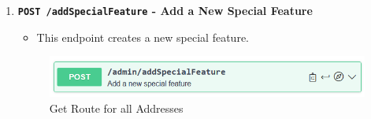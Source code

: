 \begin{enumerate}
        \item \textbf{\texttt{POST /addSpecialFeature} - Add a New Special Feature}
        \begin{itemize}
            \item This endpoint creates a new special feature.
        \end{itemize} 
        \begin{figure} [H]
            \centering
            \includegraphics [width=1\textwidth] {images/andreas/praxis/addSF.png}
            \caption{Get Route for all Addresses}
        \end{figure}
    \end{enumerate}

